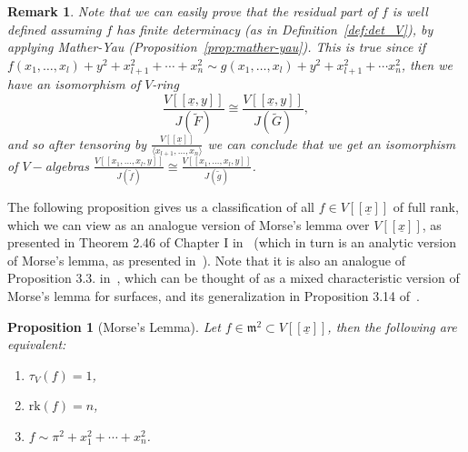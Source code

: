 \documentclass{article}
\newtheorem{proposition}[theorem]{Proposition}
\newtheorem{remark}[theorem]{Remark}
\numberwithin{theorem}{section}
\begin{document}
\begin{remark}\label{rem:rk}
 \textup{Note that we can easily prove that the residual part of $f$ is well defined assuming $f$ has finite determinacy (as in Definition~\ref{def:det_V}), by applying Mather-Yau (Proposition~\ref{prop:mather-yau}). This is true since if $ f\left(x_1, \dots, x_l\right) + y^2 +x_{l+1}^2 + \cdots  + x_n^2 \sim  g\left(x_1, \dots, x_l\right)+ y^2 + x_{l+1}^2 + \cdots x_n^2$, then we have an isomorphism of $V$-ring 
\begin{equation*}
    \frac{V[[\underline{x},y]]}{J(\tilde{F})} \cong \frac{V[[\underline{x},y]]}{J(\tilde{G})}, 
\end{equation*}
and so after tensoring by $\frac{V[[\underline{x}]]}{\langle x_{l+1}, \dots, x_n\rangle}$ we can conclude that we get an isomorphism of $V-$algebras $\frac{V[[x_1, \dots, x_l,y]]}{J(\tilde{f})} \cong \frac{V[[x_1, \dots, x_l,y]]}{J(\tilde{g})}$. }
\end{remark}


The following proposition gives us a classification of all $f \in V[[\underline{x}]]$ of full rank, which we can view as an analogue version of Morse's lemma over $V[[\underline{x}]]$, as presented in Theorem 2.46 of Chapter I in~\cite{greuel2007introduction} (which in turn is an analytic version of Morse's lemma, as presented in~\cite{ morse1934calculus, varchenko1985singularities}).  Note that it is also an analogue of Proposition 3.3. in~\cite{carvajal2019covers}, which can be thought of as a mixed characteristic version of Morse's lemma for surfaces, and its generalization in Proposition 3.14 of~\cite{svoray2025ade}. 

\begin{proposition} [Morse's Lemma]\label{prop:Morse}
    Let $f \in \mathfrak{m}^2 \subset V[[\underline{x}]]$, then the following are equivalent:
    \begin{enumerate}
        \item $\tau_V\left(f\right)=1$, 
        \item $\text{rk}\left(f\right)=n$, 
        \item $f \sim  \pi^2 + x_1^2 +\cdots + x_n^2$. 
    \end{enumerate}
\end{proposition}
\end{document}
